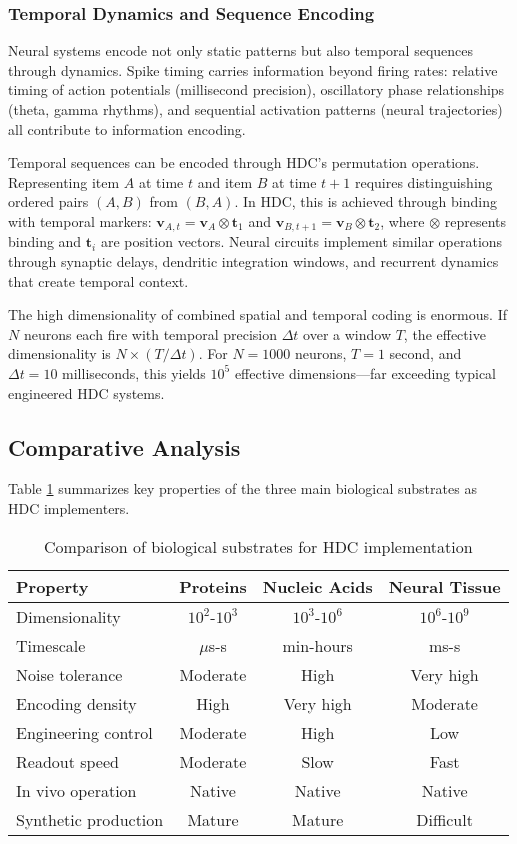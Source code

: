 \documentclass[12pt]{article}
\begin{document}
\subsubsection{Temporal Dynamics and Sequence Encoding}

Neural systems encode not only static patterns but also temporal sequences through dynamics. Spike timing carries information beyond firing rates: relative timing of action potentials (millisecond precision), oscillatory phase relationships (theta, gamma rhythms), and sequential activation patterns (neural trajectories) all contribute to information encoding.

Temporal sequences can be encoded through HDC's permutation operations. Representing item $A$ at time $t$ and item $B$ at time $t+1$ requires distinguishing ordered pairs $(A,B)$ from $(B,A)$. In HDC, this is achieved through binding with temporal markers: $\mathbf{v}_{A,t} = \mathbf{v}_A \otimes \mathbf{t}_1$ and $\mathbf{v}_{B,t+1} = \mathbf{v}_B \otimes \mathbf{t}_2$, where $\otimes$ represents binding and $\mathbf{t}_i$ are position vectors. Neural circuits implement similar operations through synaptic delays, dendritic integration windows, and recurrent dynamics that create temporal context.

The high dimensionality of combined spatial and temporal coding is enormous. If $N$ neurons each fire with temporal precision $\Delta t$ over a window $T$, the effective dimensionality is $N \times (T/\Delta t)$. For $N = 1000$ neurons, $T = 1$ second, and $\Delta t = 10$ milliseconds, this yields $10^5$ effective dimensions—far exceeding typical engineered HDC systems.

\subsection{Comparative Analysis}

Table \ref{tab:substrate_comparison} summarizes key properties of the three main biological substrates as HDC implementers.

\begin{table}[ht]
\centering
\caption{Comparison of biological substrates for HDC implementation}
\label{tab:substrate_comparison}
\begin{tabular}{|l|c|c|c|}
\hline
\textbf{Property} & \textbf{Proteins} & \textbf{Nucleic Acids} & \textbf{Neural Tissue} \\
\hline
Dimensionality & $10^2$-$10^3$ & $10^3$-$10^6$ & $10^6$-$10^9$ \\
Timescale & $\mu$s-s & min-hours & ms-s \\
Noise tolerance & Moderate & High & Very high \\
Encoding density & High & Very high & Moderate \\
Engineering control & Moderate & High & Low \\
Readout speed & Moderate & Slow & Fast \\
In vivo operation & Native & Native & Native \\
Synthetic production & Mature & Mature & Difficult \\
\hline
\end{tabular}
\end{table}
\end{document}
